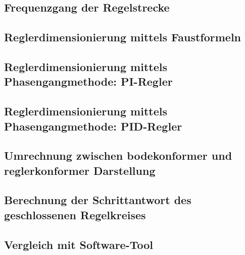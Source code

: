 \clearpage
\subsection{Frequenzgang der Regelstrecke}
\label{subs:frequenzgang}


\clearpage
\subsection{Reglerdimensionierung mittels Faustformeln}
\label{subs:faustformeln}


\clearpage
\subsection{Reglerdimensionierung mittels Phasengangmethode: PI-Regler}
\label{subs:phasengang:pi}


\clearpage
\subsection{Reglerdimensionierung mittels Phasengangmethode: PID-Regler}
\label{subs:phasengang:pid}


\clearpage
\subsection{Umrechnung zwischen bodekonformer und reglerkonformer Darstellung}
\label{subs:bode_regler}


\clearpage
\subsection{Berechnung der Schrittantwort des geschlossenen Regelkreises}
\label{subs:fft}


\clearpage
\subsection{Vergleich mit Software-Tool}
\label{subs:tool:results}

